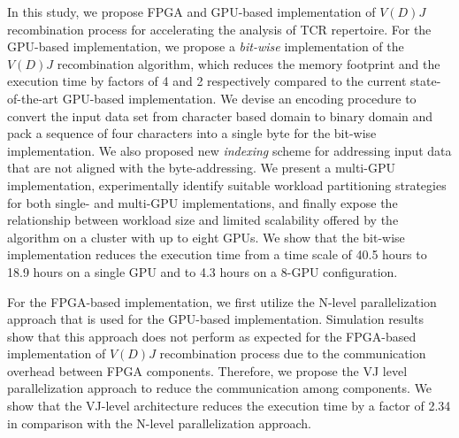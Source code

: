 \documentclass[dissertation,copyright]{uathesis}
\begin{document}
In this study, we propose FPGA and GPU-based implementation of $V(D)J$ recombination process for accelerating the analysis of TCR repertoire. For the GPU-based implementation, we propose a \emph{bit-wise} implementation of the $V(D)J$ recombination algorithm, which reduces the memory footprint and the execution time by factors of 4 and 2 respectively compared to the current state-of-the-art GPU-based implementation. We devise an encoding procedure to convert the input data set from character based domain to binary domain and pack a sequence of four characters into a single byte for the bit-wise implementation. We also proposed new \emph{indexing} scheme for addressing input data that are not aligned with the byte-addressing. We present a multi-GPU implementation, experimentally identify suitable workload partitioning strategies for both single- and multi-GPU implementations, and finally expose the relationship between workload size and limited scalability offered by the algorithm on a cluster with up to eight GPUs.  We show that the bit-wise implementation reduces the execution time from a time scale of 40.5 hours to 18.9 hours on a single GPU and to 4.3 hours on a 8-GPU configuration. 

For the FPGA-based implementation, we first utilize the N-level parallelization approach that is used for the GPU-based implementation. Simulation results show that this approach does not perform as expected for the FPGA-based implementation of $V(D)J$ recombination process due to the communication overhead between FPGA components. Therefore, we propose the VJ level parallelization approach to reduce the communication among components. We show that the VJ-level architecture reduces the execution time by a factor of 2.34 in comparison with the N-level parallelization approach. 







%

\renewcommand{\baselinestretch}{1}		%
\small\normalsize										%



\end{document}
